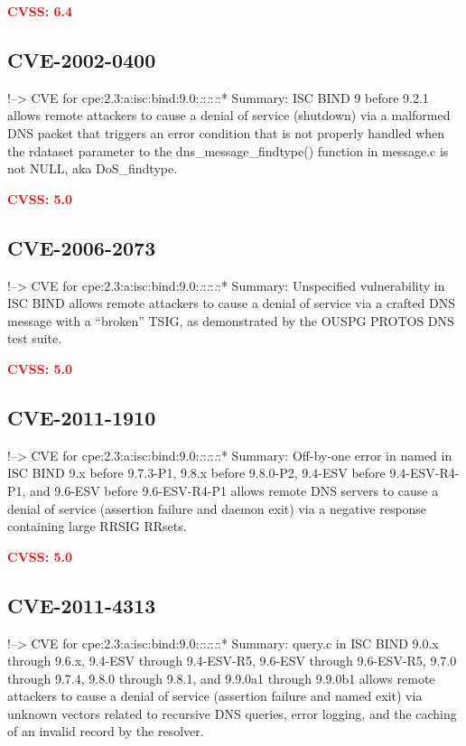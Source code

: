 \documentclass[a4paper, 12pt]{article}
\begin{document}
\textbf{\textcolor{red}{CVSS: 6.4}}

\hypertarget{cve-2002-0400}{%
\subsection{CVE-2002-0400}\label{cve-2002-0400}}

!--\textgreater{} CVE for
cpe:2.3:a:isc:bind:9.0:\emph{:}:\emph{:}:\emph{:}:* Summary: ISC BIND 9
before 9.2.1 allows remote attackers to cause a denial of service
(shutdown) via a malformed DNS packet that triggers an error condition
that is not properly handled when the rdataset parameter to the
dns\_message\_findtype() function in message.c is not NULL, aka
DoS\_findtype.

\textbf{\textcolor{red}{CVSS: 5.0}}

\hypertarget{cve-2006-2073}{%
\subsection{CVE-2006-2073}\label{cve-2006-2073}}

!--\textgreater{} CVE for
cpe:2.3:a:isc:bind:9.0:\emph{:}:\emph{:}:\emph{:}:* Summary: Unspecified
vulnerability in ISC BIND allows remote attackers to cause a denial of
service via a crafted DNS message with a ``broken'' TSIG, as
demonstrated by the OUSPG PROTOS DNS test suite.

\textbf{\textcolor{red}{CVSS: 5.0}}

\hypertarget{cve-2011-1910}{%
\subsection{CVE-2011-1910}\label{cve-2011-1910}}

!--\textgreater{} CVE for
cpe:2.3:a:isc:bind:9.0:\emph{:}:\emph{:}:\emph{:}:* Summary: Off-by-one
error in named in ISC BIND 9.x before 9.7.3-P1, 9.8.x before 9.8.0-P2,
9.4-ESV before 9.4-ESV-R4-P1, and 9.6-ESV before 9.6-ESV-R4-P1 allows
remote DNS servers to cause a denial of service (assertion failure and
daemon exit) via a negative response containing large RRSIG RRsets.

\textbf{\textcolor{red}{CVSS: 5.0}}

\hypertarget{cve-2011-4313}{%
\subsection{CVE-2011-4313}\label{cve-2011-4313}}

!--\textgreater{} CVE for
cpe:2.3:a:isc:bind:9.0:\emph{:}:\emph{:}:\emph{:}:* Summary: query.c in
ISC BIND 9.0.x through 9.6.x, 9.4-ESV through 9.4-ESV-R5, 9.6-ESV
through 9.6-ESV-R5, 9.7.0 through 9.7.4, 9.8.0 through 9.8.1, and
9.9.0a1 through 9.9.0b1 allows remote attackers to cause a denial of
service (assertion failure and named exit) via unknown vectors related
to recursive DNS queries, error logging, and the caching of an invalid
record by the resolver.
\end{document}
